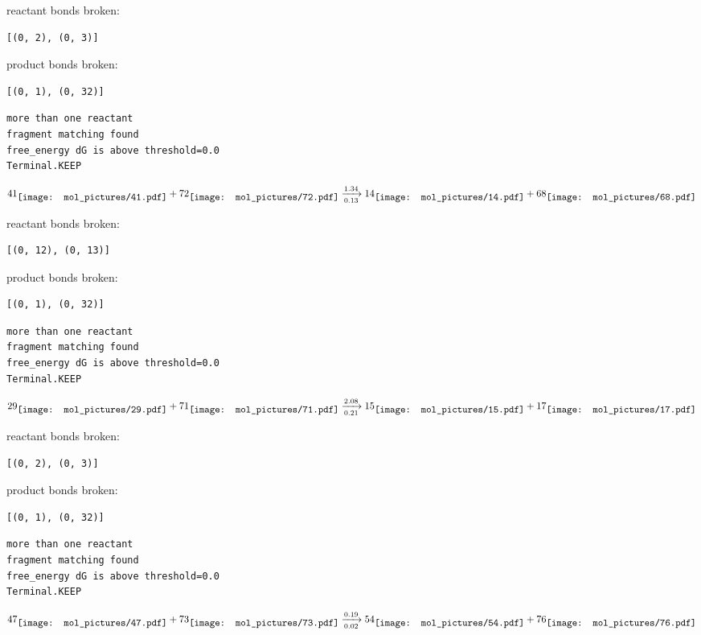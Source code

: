 \documentclass{article}
\begin{document}
reactant bonds broken:\begin{verbatim}
[(0, 2), (0, 3)]
\end{verbatim}
product bonds broken:\begin{verbatim}
[(0, 1), (0, 32)]
\end{verbatim}




\vspace{1cm}
\begin{verbatim}
more than one reactant
fragment matching found
free_energy dG is above threshold=0.0
Terminal.KEEP
\end{verbatim}
$$
41
\raisebox{-.5\height}{\texttt{[image: mol\_pictures/41.pdf]}}
+
72
\raisebox{-.5\height}{\texttt{[image: mol\_pictures/72.pdf]}}
\xrightarrow[0.13]{1.34}
14
\raisebox{-.5\height}{\texttt{[image: mol\_pictures/14.pdf]}}
+
68
\raisebox{-.5\height}{\texttt{[image: mol\_pictures/68.pdf]}}
$$


reactant bonds broken:\begin{verbatim}
[(0, 12), (0, 13)]
\end{verbatim}
product bonds broken:\begin{verbatim}
[(0, 1), (0, 32)]
\end{verbatim}




\vspace{1cm}
\begin{verbatim}
more than one reactant
fragment matching found
free_energy dG is above threshold=0.0
Terminal.KEEP
\end{verbatim}
$$
29
\raisebox{-.5\height}{\texttt{[image: mol\_pictures/29.pdf]}}
+
71
\raisebox{-.5\height}{\texttt{[image: mol\_pictures/71.pdf]}}
\xrightarrow[0.21]{2.08}
15
\raisebox{-.5\height}{\texttt{[image: mol\_pictures/15.pdf]}}
+
17
\raisebox{-.5\height}{\texttt{[image: mol\_pictures/17.pdf]}}
$$


reactant bonds broken:\begin{verbatim}
[(0, 2), (0, 3)]
\end{verbatim}
product bonds broken:\begin{verbatim}
[(0, 1), (0, 32)]
\end{verbatim}




\vspace{1cm}
\begin{verbatim}
more than one reactant
fragment matching found
free_energy dG is above threshold=0.0
Terminal.KEEP
\end{verbatim}
$$
47
\raisebox{-.5\height}{\texttt{[image: mol\_pictures/47.pdf]}}
+
73
\raisebox{-.5\height}{\texttt{[image: mol\_pictures/73.pdf]}}
\xrightarrow[0.02]{0.19}
54
\raisebox{-.5\height}{\texttt{[image: mol\_pictures/54.pdf]}}
+
76
\raisebox{-.5\height}{\texttt{[image: mol\_pictures/76.pdf]}}
$$
\end{document}
